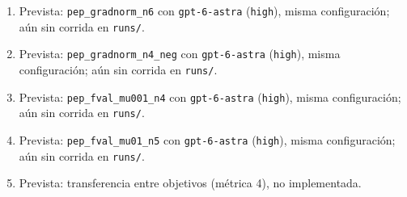 \documentclass[11pt,a4paper]{article}
\begin{document}
\begin{enumerate}
  \item Prevista: \texttt{pep\_\allowbreak{}gradnorm\_\allowbreak{}n6} con \texttt{gpt-\allowbreak{}6-\allowbreak{}astra} (\texttt{high}), misma configuración; aún sin corrida en \texttt{runs/}.
  \item Prevista: \texttt{pep\_\allowbreak{}gradnorm\_\allowbreak{}n4\_\allowbreak{}neg} con \texttt{gpt-\allowbreak{}6-\allowbreak{}astra} (\texttt{high}), misma configuración; aún sin corrida en \texttt{runs/}.
  \item Prevista: \texttt{pep\_\allowbreak{}fval\_\allowbreak{}mu001\_\allowbreak{}n4} con \texttt{gpt-\allowbreak{}6-\allowbreak{}astra} (\texttt{high}), misma configuración; aún sin corrida en \texttt{runs/}.
  \item Prevista: \texttt{pep\_\allowbreak{}fval\_\allowbreak{}mu01\_\allowbreak{}n5} con \texttt{gpt-\allowbreak{}6-\allowbreak{}astra} (\texttt{high}), misma configuración; aún sin corrida en \texttt{runs/}.
  \item Prevista: transferencia entre objetivos (métrica 4), no implementada.
\end{enumerate}


\end{document}
